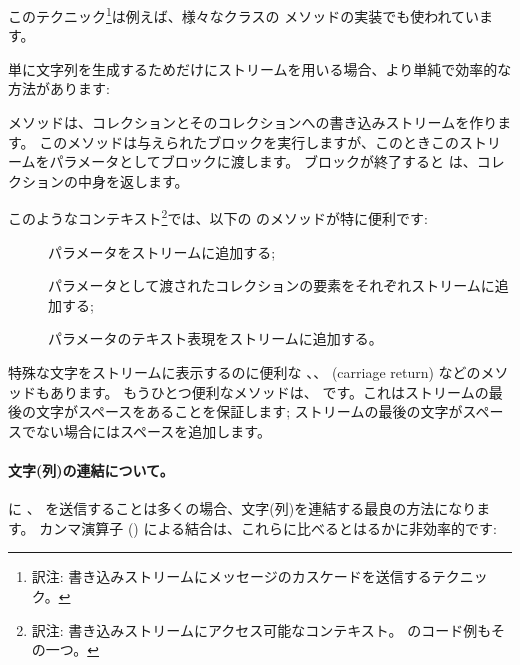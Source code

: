 \documentclass[a4paper,10pt,twoside]{book}
\begin{document}
このテクニック\footnote{訳注: 書き込みストリームにメッセージのカスケードを送信するテクニック。}は例えば、様々なクラスの  メソッドの実装でも使われています。

単に文字列を生成するためだけにストリームを用いる場合、より単純で効率的な方法があります: %


 メソッドは、コレクションとそのコレクションへの書き込みストリームを作ります。
このメソッドは与えられたブロックを実行しますが、このときこのストリームをパラメータとしてブロックに渡します。
ブロックが終了すると  は、コレクションの中身を返します。

このようなコンテキスト\footnote{訳注: 書き込みストリームにアクセス可能なコンテキスト。 のコード例もその一つ。}では、以下の  のメソッドが特に便利です:

\begin{description}
\item[] パラメータをストリームに追加する;
\item[] パラメータとして渡されたコレクションの要素をそれぞれストリームに追加する;
\item[] パラメータのテキスト表現をストリームに追加する。
\end{description}

特殊な文字をストリームに表示するのに便利な 、、 (carriage return) などのメソッドもあります。%
もうひとつ便利なメソッドは、 です。これはストリームの最後の文字がスペースをあることを保証します; ストリームの最後の文字がスペースでない場合にはスペースを追加します。

\paragraph{文字(列)の連結について。}
 に 、 を送信することは多くの場合、文字(列)を連結する最良の方法になります。
カンマ演算子 (\ct{,}) による結合は、これらに比べるとはるかに非効率的です:
\end{document}

